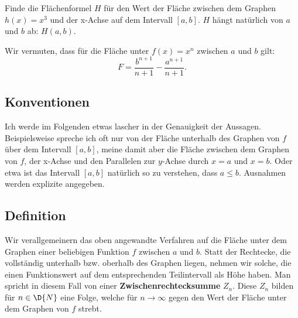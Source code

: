 \documentclass[%
11pt,%
twoside,%
titlepage,%
german,%
headsepline%
]{scrartcl}
\begin{document}
\begin{ueb}[hoch 3]
Finde die Flächenformel $H$ für den Wert der Fläche zwischen dem Graphen $h(x)=x^3$ und der x-Achse auf dem Intervall $[a,b]$. $H$ hängt natürlich von $a$ und $b$ ab: $H(a,b)$.
\begin{center}

\end{center}
\end{ueb}

\begin{bem}
Wir vermuten, dass für die Fläche unter $f(x)=x^n$ zwischen $a$ und $b$ gilt:
$$F = \frac{b^{n+1}}{n+1}-\frac{a^{n+1}}{n+1}.$$
\end{bem}

\subsection{Konventionen}
Ich werde im Folgenden etwas lascher in der Genauigkeit der Aussagen. Beispielsweise spreche ich oft nur von der Fläche unterhalb des Graphen von $f$ über dem Intervall $[a,b]$, meine damit aber die Fläche zwischen dem Graphen von $f$, der x-Achse und den Parallelen zur $y$-Achse durch $x=a$ und $x=b$. Oder etwa ist das Intervall $[a,b]$ natürlich so zu verstehen, dass $a\leq b$. Ausnahmen werden explizite angegeben.

\subsection{Definition}
Wir verallgemeinern das oben angewandte Verfahren auf die Fläche unter dem Graphen einer beliebigen Funktion $f$ zwischen $a$ und $b$. Statt der Rechtecke, die vollständig unterhalb bzw. oberhalb des Graphen liegen, nehmen wir solche, die einen Funktionswert auf dem entsprechenden Teilintervall als Höhe haben. Man spricht in diesem Fall von einer \textbf{Zwischenrechtecksumme} $Z_n$. Diese $Z_n$ bilden für $n\in\D{N}$ eine Folge, welche für $n\rightarrow\infty$ gegen den Wert der Fläche unter dem Graphen von $f$ strebt.
\end{document}
